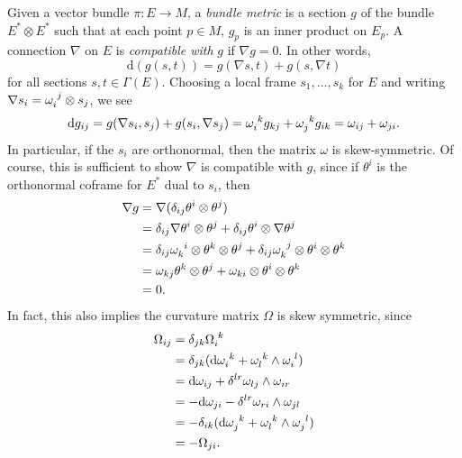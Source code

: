 \documentclass{book}
\renewcommand{\d}{\mathrm{d}}
\theoremstyle{definition}
\numberwithin{equation}{section}
\begin{document}
Given a vector bundle $\pi \colon E \to M$, a \textit{bundle metric} is a section $g$ of the bundle $E^* \otimes E^*$ such that at each point $p \in M$, $g_p$ is an inner product on $E_p$. A connection $\nabla$ on $E$ is \textit{compatible with} $g$ if $\nabla g = 0$. In other words,
\begin{equation}
    \d(g(s,t)) = g(\nabla s,t) + g(s,\nabla t)
\end{equation}
for all sections $s,t \in \Gamma(E)$. Choosing a local frame $s_1,\dots,s_k$ for $E$ and writing $\nabla s_i = \tensor{\omega}{_i^j} \otimes s_j$, we see 
\begin{equation}
    \d g_{ij} = g(\nabla s_i,s_j) + g(s_i, \nabla s_j) = \tensor{\omega}{_i^k} g_{kj} + \tensor{\omega}{_j^k} g_{ik} = \omega_{ij} + \omega_{ji}.
\end{equation}
In particular, if the $s_i$ are orthonormal, then the matrix $\omega$ is skew-symmetric. Of course, this is sufficient to show $\nabla$ is compatible with $g$, since if $\theta^i$ is the orthonormal coframe for $E^*$ dual to $s_i$, then 
\begin{equation} \begin{aligned}
    \nabla g &= \nabla(\delta_{ij} \theta^i \otimes \theta^j) \\
             &= \delta_{ij} \nabla \theta^i \otimes \theta^j + \delta_{ij} \theta^i \otimes \nabla \theta^j \\
             &= \delta_{ij} \tensor{\omega}{_k^i} \otimes \theta^k \otimes \theta^j + \delta_{ij} \tensor{\omega}{_k^j} \otimes \theta^i \otimes \theta^k \\
             &= \omega_{kj} \theta^k \otimes \theta^j + \omega_{ki} \otimes \theta^i \otimes \theta^k \\
             &= 0.
\end{aligned} \end{equation}
In fact, this also implies the curvature matrix $\Omega$ is skew symmetric, since 
\begin{equation} \begin{aligned}
    \Omega_{ij} &= \delta_{jk} \tensor{\Omega}{_i^k} \\
                &= \delta_{jk} ( \d\tensor{\omega}{_i^k} + \tensor{\omega}{_l^k} \wedge \tensor{\omega}{_i^l} ) \\
                &= \d\omega_{ij} + \delta^{lr} \omega_{lj} \wedge \omega_{ir} \\
                &= - \d\omega_{ji} - \delta^{lr} \omega_{ri} \wedge \omega_{jl} \\
                &= - \delta_{ik} (\d\tensor{\omega}{_j^k} + \tensor{\omega}{_l^k} \wedge \tensor{\omega}{_j^l}) \\
                &= - \Omega_{ji}.
\end{aligned} \end{equation}
\end{document}
